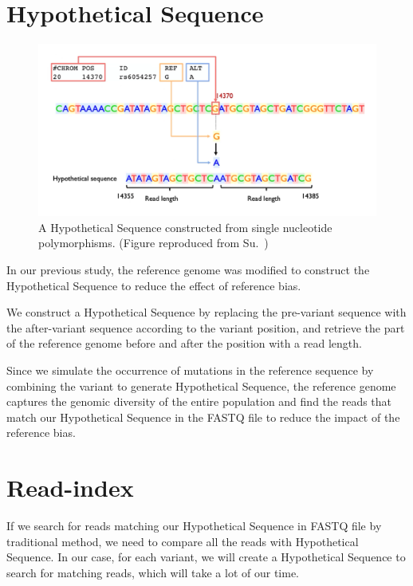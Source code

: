 \documentclass[PhD]{PHlab-thesis}
\begin{document}
\section{Hypothetical Sequence}
\begin{figure}[h!]
	\centering
	\includegraphics[scale=0.25]{figures/Hypothetical Sequence.png}
	\caption{A Hypothetical Sequence constructed from single nucleotide polymorphisms. (Figure reproduced from Su.~\cite{Su2021RI})}
	\label{fig:Hypothetical Sequence} %
\end{figure}
In our previous study, the reference genome was modified to construct the Hypothetical Sequence to reduce the effect of reference bias.

We construct a Hypothetical Sequence by replacing the pre-variant sequence with the after-variant sequence according to the variant position, and retrieve the part of the reference genome before and after the position with a read length.

Since we simulate the occurrence of mutations in the reference sequence by combining the variant to generate Hypothetical Sequence, the reference genome captures the genomic diversity of the entire population and find the reads that match our Hypothetical Sequence in the FASTQ file to reduce the impact of the reference bias.
\section{Read-index}
If we search for reads matching our Hypothetical Sequence in FASTQ file by traditional method, we need to compare all the reads with Hypothetical Sequence. In our case, for each variant, we will create a Hypothetical Sequence to search for matching reads, which will take a lot of our time.
\end{document}
